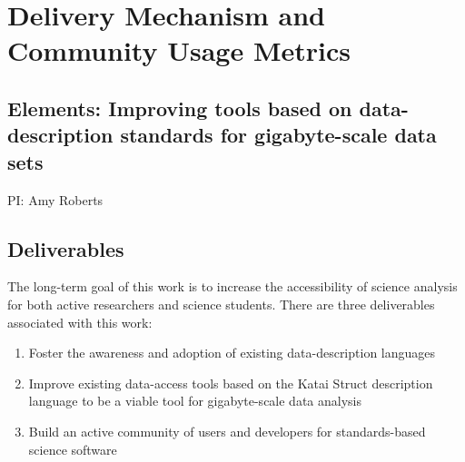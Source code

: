 \documentclass[11pt,oneside]{memoir}
\begin{document}
\mainmatter
\pagestyle{bodystyle}

\section*{Delivery Mechanism and Community Usage Metrics}
\subsection*{Elements: Improving tools based on data-description standards for gigabyte-scale data sets}
PI: Amy Roberts

\subsection{Deliverables}
The long-term goal of this work is to increase the accessibility of science analysis for both active researchers and science students.  There are three deliverables associated with this work:

\begin{enumerate}
  \item Foster the awareness and adoption of existing data-description languages 
  \item Improve existing data-access tools based on the Katai Struct description language to be a viable tool for gigabyte-scale data analysis
  \item Build an active community of users and developers for standards-based science software
\end{enumerate}
\end{document}
